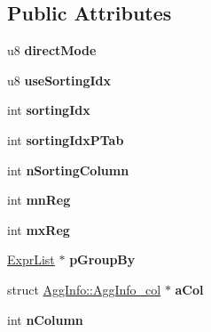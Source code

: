 \subsection*{Public Attributes}
\begin{DoxyCompactItemize}
\item 
u8 {\bfseries direct\+Mode}\hypertarget{structAggInfo_aaa57d294016ac7e17e7cacaa7b25634e}{}\label{structAggInfo_aaa57d294016ac7e17e7cacaa7b25634e}

\item 
u8 {\bfseries use\+Sorting\+Idx}\hypertarget{structAggInfo_a8173a7ea13c4a12ce4befbcb40719073}{}\label{structAggInfo_a8173a7ea13c4a12ce4befbcb40719073}

\item 
int {\bfseries sorting\+Idx}\hypertarget{structAggInfo_a97ce74f509ca908a616c123e7196797b}{}\label{structAggInfo_a97ce74f509ca908a616c123e7196797b}

\item 
int {\bfseries sorting\+Idx\+P\+Tab}\hypertarget{structAggInfo_a7faac4c3996598960fc46f0c173b244c}{}\label{structAggInfo_a7faac4c3996598960fc46f0c173b244c}

\item 
int {\bfseries n\+Sorting\+Column}\hypertarget{structAggInfo_a89925dccd1a0ec51d2a5a5dbaead66dc}{}\label{structAggInfo_a89925dccd1a0ec51d2a5a5dbaead66dc}

\item 
int {\bfseries mn\+Reg}\hypertarget{structAggInfo_aa9a656c3db8fe0f2905062bbcc55efdc}{}\label{structAggInfo_aa9a656c3db8fe0f2905062bbcc55efdc}

\item 
int {\bfseries mx\+Reg}\hypertarget{structAggInfo_a7aec99396ee3da0bdd985685de1b9da2}{}\label{structAggInfo_a7aec99396ee3da0bdd985685de1b9da2}

\item 
\hyperlink{structExprList}{Expr\+List} $\ast$ {\bfseries p\+Group\+By}\hypertarget{structAggInfo_aa8e942103d224c4db847743670907781}{}\label{structAggInfo_aa8e942103d224c4db847743670907781}

\item 
struct \hyperlink{structAggInfo_1_1AggInfo__col}{Agg\+Info\+::\+Agg\+Info\+\_\+col} $\ast$ {\bfseries a\+Col}\hypertarget{structAggInfo_a52fa1a7eb3145c27be13b2bcccd57d62}{}\label{structAggInfo_a52fa1a7eb3145c27be13b2bcccd57d62}

\item 
int {\bfseries n\+Column}\hypertarget{structAggInfo_a9cbfa5fc33328cf3500426674e036a8b}{}\label{structAggInfo_a9cbfa5fc33328cf3500426674e036a8b}


\end{DoxyCompactItemize}
